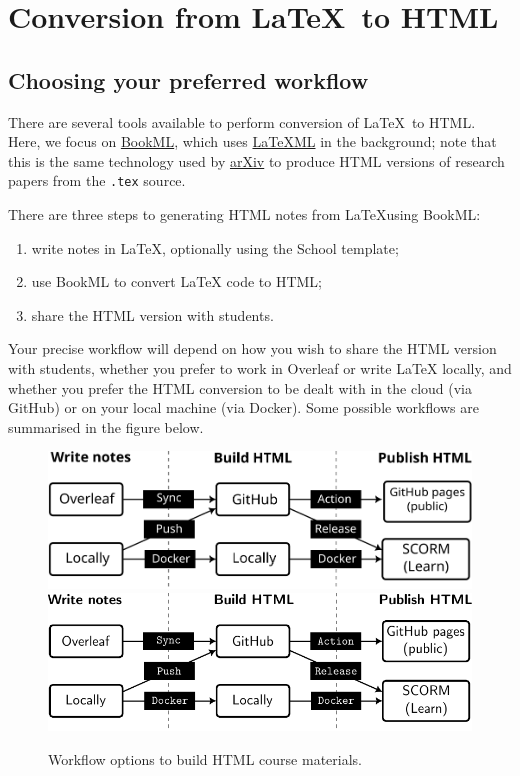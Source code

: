 \chapter{Conversion from \protect\LaTeX\ to HTML}
\label{ch:latex-to-html}

\section{Choosing your preferred workflow}

There are several tools available to perform conversion of \LaTeX\ to HTML. Here, we focus on \href{https://vlmantova.github.io/bookml/}{BookML}, which uses \href{https://math.nist.gov/~BMiller/LaTeXML/}{LaTeXML} in the background; note that this is the same technology used by \href{https://info.arxiv.org/about/accessible_HTML.html}{arXiv} to produce HTML versions of research papers from the \verb|.tex| source.

There are three steps to generating HTML notes from \LaTeX using BookML:

\begin{enumerate}
    \item write notes in \LaTeX{}, optionally using the School template;
    \item use BookML to convert \LaTeX{} code to HTML;
    \item share the HTML version with students.
\end{enumerate}

Your precise workflow will depend on how you wish to share the HTML version with students, whether you prefer to work in Overleaf or write \LaTeX{} locally, and whether you prefer the HTML conversion to be dealt with in the cloud (via GitHub) or on your local machine (via Docker). Some possible workflows are summarised in the figure below.

\begin{figure}[h]
    \centering
    \iflatexml
        \includegraphics{img/process.svg}
    \else
        \includegraphics{img/process.pdf}
    \fi
    \caption{Workflow options to build HTML course materials.}
    \label{fig:workflow}
\end{figure}

